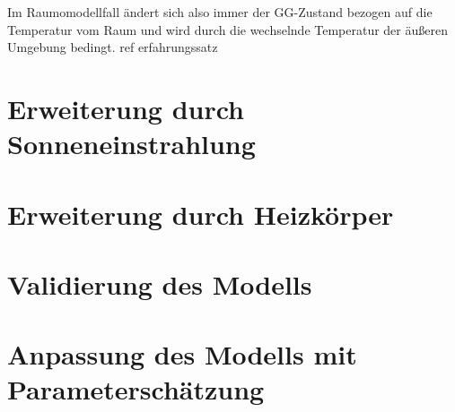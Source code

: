 Im Raumomodellfall ändert sich also immer der GG-Zustand bezogen auf die Temperatur vom Raum und wird durch die wechselnde Temperatur der äußeren Umgebung bedingt.
ref erfahrungssatz


\section{Erweiterung durch Sonneneinstrahlung}


\section{Erweiterung durch Heizkörper}

\section{Validierung des Modells}

\section{Anpassung des Modells mit Parameterschätzung}